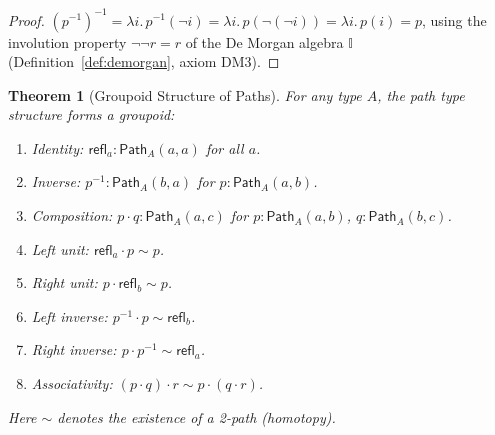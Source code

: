 \documentclass[11pt,a4paper]{report}
\theoremstyle{definition}
\theoremstyle{plain}
\newtheorem{theorem}[definition]{Theorem}
\newcommand{\Path}{\mathsf{Path}}
\newcommand{\interval}{\mathbb{I}}
\begin{document}
\begin{proof}
$(p^{-1})^{-1} = \lambda i.\, p^{-1}(\lnot i) = \lambda i.\, p(\lnot(\lnot i))
= \lambda i.\, p(i) = p$, using the involution property $\lnot \lnot r = r$
of the De Morgan algebra $\interval$
(Definition~\ref{def:demorgan}, axiom DM3).
\end{proof}

\begin{theorem}[Groupoid Structure of Paths]
\label{thm:path-groupoid}
For any type $A$, the path type structure forms a groupoid:
\begin{enumerate}
  \item \emph{Identity}: $\mathsf{refl}_a : \Path_A(a, a)$ for all $a$.
  \item \emph{Inverse}: $p^{-1} : \Path_A(b, a)$ for $p : \Path_A(a, b)$.
  \item \emph{Composition}: $p \cdot q : \Path_A(a, c)$ for $p : \Path_A(a, b)$,
    $q : \Path_A(b, c)$.
  \item \emph{Left unit}: $\mathsf{refl}_a \cdot p \sim p$.
  \item \emph{Right unit}: $p \cdot \mathsf{refl}_b \sim p$.
  \item \emph{Left inverse}: $p^{-1} \cdot p \sim \mathsf{refl}_b$.
  \item \emph{Right inverse}: $p \cdot p^{-1} \sim \mathsf{refl}_a$.
  \item \emph{Associativity}: $(p \cdot q) \cdot r \sim p \cdot (q \cdot r)$.
\end{enumerate}
Here $\sim$ denotes the existence of a 2-path (homotopy).
\end{theorem}
\end{document}
